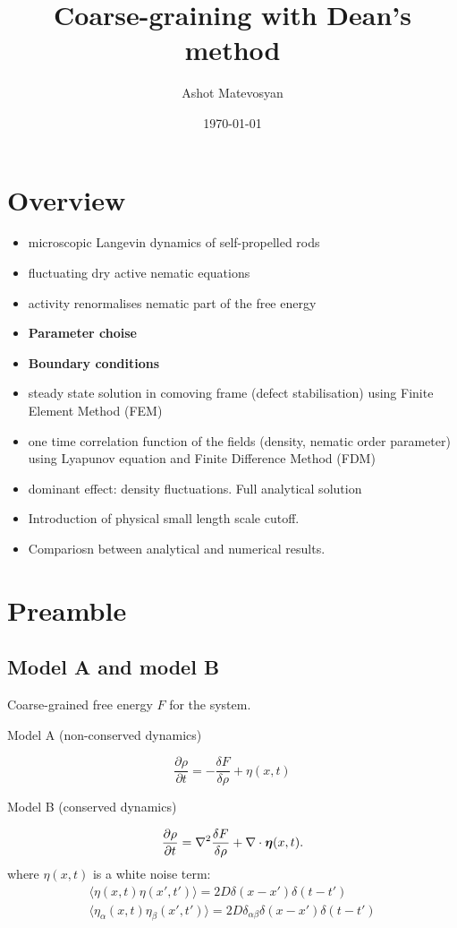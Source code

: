 \documentclass[a5paper]{article}
\title{Coarse-graining with Dean's method}
\author{Ashot Matevosyan}
\date{\today}
\begin{document}
\maketitle
\tableofcontents

\section*{Overview}
\begin{itemize}
    \item microscopic Langevin dynamics of self-propelled rods
    \item fluctuating dry active nematic equations
    \item activity renormalises nematic part of the free energy
    \item \textbf{Parameter choise}
    \item \textbf{Boundary conditions}
    \item steady state solution in comoving frame (defect stabilisation) using Finite Element Method (FEM)
    \item one time correlation function of the fields (density, nematic order parameter) using Lyapunov equation and Finite Difference Method (FDM)
    \item dominant effect: density fluctuations. Full analytical solution
    \item Introduction of physical small length scale cutoff.
    \item Compariosn between analytical and numerical results.
\end{itemize}

\section{Preamble}
\subsection{Model A and model B}
Coarse-grained free energy $F$ for the system.

Model A (non-conserved dynamics)

\begin{equation}\frac{\partial \rho}{\partial t}=-\frac{\delta F}{\delta \rho}+\eta(x, t)
\end{equation}

Model B (conserved dynamics)

\begin{equation}
\frac{\partial \rho}{\partial t}=\nabla^2 \frac{\delta F}{\delta \rho}+\nabla \cdot \boldsymbol\eta(x, t) .
\end{equation}
where $\eta(x, t)$ is a white noise term:
\begin{align}
    \langle \eta(x, t) \eta(x', t') \rangle = 2D \delta(x - x') \delta(t - t') \\ \langle \eta_\alpha(x, t) \eta_\beta(x', t') \rangle = 2D \delta_{\alpha\beta} \delta(x - x') \delta(t - t')
\end{align}
\end{document}
